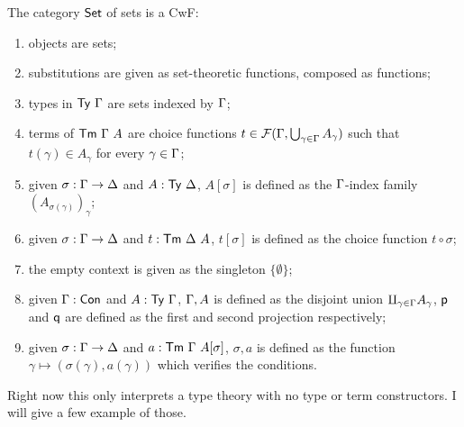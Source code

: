 The category \(\mathsf{Set}\) of sets is a \acrshort{CwF}:
\begin{enumerate}
  \item objects are sets;
  \item substitutions are given as set-theoretic functions, composed as
  functions;
  \item types in \(\mathsf{Ty}\ \Gamma\) are sets indexed by \(\Gamma\);
  \item terms of \(\mathsf{Tm}\ \Gamma\ A\) are choice functions
  \(t \in \mathcal{F}(\Gamma,\bigcup_{\gamma \in \Gamma} A_\gamma)\) such that
  \(t(\gamma) \in A_\gamma\) for every \(\gamma \in \Gamma\);
  \item given \(\sigma : \Gamma \to \Delta\) and \(A : \mathsf{Ty}\ \Delta\), \(A[\sigma]\)
  is defined as the \(\Gamma\)-index family \((A_{\sigma(\gamma)})_\gamma\);
  \item given \(\sigma : \Gamma \to \Delta\) and \(t : \mathsf{Tm}\ \Delta\ A\), \(t[\sigma]\)
  is defined as the choice function \(t \circ \sigma\);
  \item the empty context is given as the singleton \(\{ \emptyset \}\);
  \item given \(\Gamma : \mathsf{Con}\) and \(A : \mathsf{Ty}\ \Gamma\), \(\Gamma, A\) is defined as
  the disjoint union \(\amalg_{\gamma \in \Gamma} A_\gamma\), \(\mathsf{p}\) and \(\mathsf{q}\)
  are defined as the first and second projection respectively;
  \item given \(\sigma : \Gamma \to \Delta\) and \(a : \mathsf{Tm}\ \Gamma\ A[\sigma]\),
  \(\sigma, a\) is defined as the function
  \(\gamma \mapsto (\sigma(\gamma), a(\gamma))\) which verifies the conditions.
\end{enumerate}

Right now this only interprets a type theory with no type or term constructors.
I will give a few example of those.


